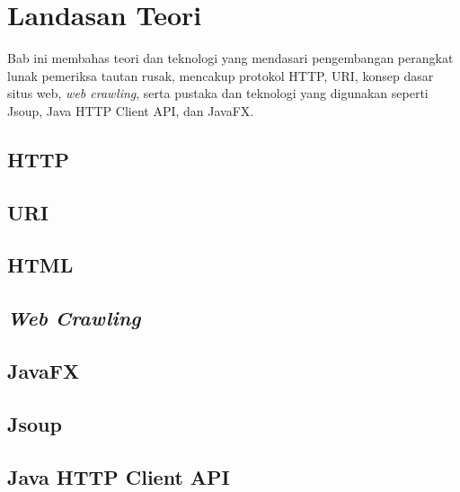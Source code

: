 \chapter{Landasan Teori}
\label{chap:landasan-teori}
Bab ini membahas teori dan teknologi yang mendasari pengembangan perangkat lunak pemeriksa tautan rusak, mencakup protokol HTTP, URI, konsep dasar situs web, \textit{web crawling}, serta pustaka dan teknologi yang digunakan seperti Jsoup, Java HTTP Client API, dan JavaFX.

\section{HTTP~\cite{RFC9110}}
\label{sec:02-http}
% 


\section{URI~\cite{RFC3986}}
\label{sec:02-uri}
% 


\section{HTML~\cite{powell:10:htmlcss}}
\label{sec:02-html}
% 


\section{\textit{Web Crawling}~\cite{liu:11:webdatamining}}
\label{sec:02-web-crawling}
% 


\section{JavaFX~\cite{sharan:22:learnjavafx17}}
\label{sec:02-javafx}
% 


\section{Jsoup}
\label{sec:02-jsoup}
% 


\section{Java HTTP Client API}
\label{sec:02-java-http-client-api}
% 


